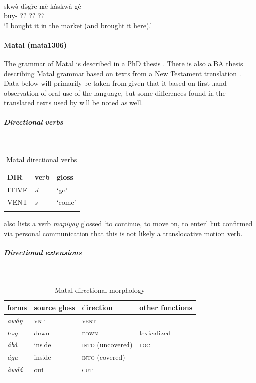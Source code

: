 \ea\label{ex2:dghw21}
 \\
\gll skwə̀-də̀gr̀e mè kàskwà gè	\\
buy- ?? ?? ??	\\
\glt `I bought it in the market (and brought it here).'
\z 

\paragraph*{Matal (mata1306)} \label{mata}

The grammar of Matal is described in a PhD thesis \citep{dougopheGrammarMatal2021}. There is also a BA thesis describing Matal grammar based on texts from a New Testament translation \citep{verdizadeSelectedTopicsGrammar2018}. Data below will primarily be taken from \citet{dougopheGrammarMatal2021} given that it based on first-hand observation of oral use of the language, but some differences found in the translated texts used by \citet{verdizadeSelectedTopicsGrammar2018} will be noted as well.

\subparagraph{Directional verbs}~

\begin{table}[H]
	\caption{Matal directional verbs} 
	\label{tab:mataV}
	\begin{tabular}{lll} %
		\lsptoprule
		DIR & verb & gloss   \\ %
		\midrule
		ITIVE & \textit{d-} & `go' \\
		VENT & \textit{s-} & `come' \\
		\lspbottomrule
	\end{tabular}
\end{table}

\citet{dougopheGrammarMatal2021} also lists a verb \textit{mapiyay} glossed `to continue, to move on, to enter' but confirmed via personal communication that this is not likely a translocative motion verb. 

\subparagraph{Directional extensions}~

\begin{table}[H]
	\caption{Matal directional morphology}
	\label{tab:mata}
	\begin{tabular}{llll} %
		\lsptoprule
		forms & source gloss & direction  & other functions  \\ %
		\midrule
		\textit{awâŋ}  &  \textsc{vnt}  &  \textsc{vent} &   \\
		\textit{həŋ}  &  {down}  &    \textsc{down} &  lexicalized \\
		\textit{ábà} & {inside} & \textsc{into} (uncovered) & \textsc{loc}  \\
		\textit{águ} & {inside} & \textsc{into} (covered) &   \\
		\textit{àwdá} & {out} & \textsc{out} &   \\
		\lspbottomrule
	\end{tabular}
\end{table} 

